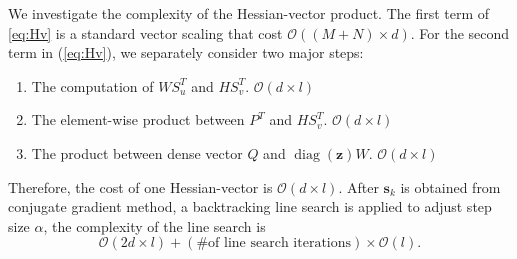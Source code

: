 \documentclass[11pt,twoside]{article}
\newcommand{\bsym}[1]{\ensuremath{\boldsymbol{#1}}}
\newcommand{\bs}{\ensuremath{\bsym{s}}}
\newcommand{\bbO}[1]{\ensuremath{\mathcal{O}\left(#1\right)}}
\DeclareMathOperator*{\diag}{diag}
\begin{document}
We investigate the complexity of the Hessian-vector product. The first term of 
\eqref{eq:Hv} is a standard vector scaling that cost \bbO{(M+N) \times d}.
For the second term in (\ref{eq:Hv}), we separately consider two major steps:
\begin{enumerate}
    \item The computation of $WS_u^T$ and $HS_v^T$. $\bbO{d \times l}$
    \item The element-wise product between $P^T$ and $HS_v^T$.  $\bbO{ d \times l}$
    \item The product between dense vector $Q$ and $\diag{(\bsym{z})}W$. $\bbO{d \times l}$
\end{enumerate}
Therefore, the cost of one Hessian-vector  is $\bbO{d \times l}$. After $\bs_k$ is obtained from conjugate gradient method, a backtracking line search is applied to adjust step size $\alpha$, the complexity of the line search is
\begin{equation*}
\bbO{2d \times l} + (\text{\# of line search iterations})\times \bbO{l}.
\end{equation*}
\end{document}
